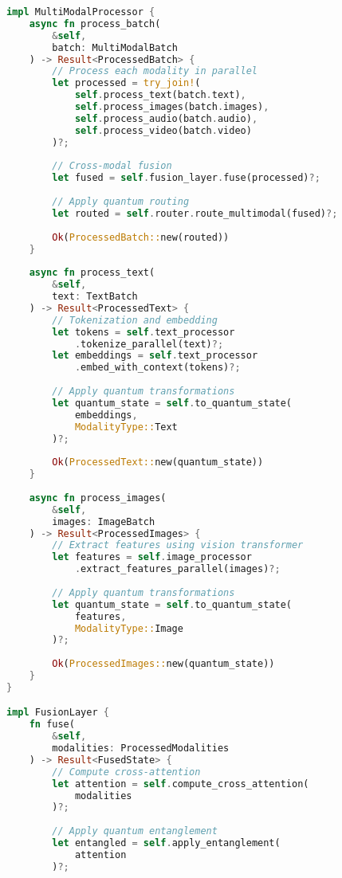 \documentclass[10pt,twocolumn]{article}
\begin{document}
\begin{lstlisting}[language=Rust]
impl MultiModalProcessor {
    async fn process_batch(
        &self,
        batch: MultiModalBatch
    ) -> Result<ProcessedBatch> {
        // Process each modality in parallel
        let processed = try_join!(
            self.process_text(batch.text),
            self.process_images(batch.images),
            self.process_audio(batch.audio),
            self.process_video(batch.video)
        )?;
        
        // Cross-modal fusion
        let fused = self.fusion_layer.fuse(processed)?;
        
        // Apply quantum routing
        let routed = self.router.route_multimodal(fused)?;
        
        Ok(ProcessedBatch::new(routed))
    }
    
    async fn process_text(
        &self,
        text: TextBatch
    ) -> Result<ProcessedText> {
        // Tokenization and embedding
        let tokens = self.text_processor
            .tokenize_parallel(text)?;
        let embeddings = self.text_processor
            .embed_with_context(tokens)?;
            
        // Apply quantum transformations
        let quantum_state = self.to_quantum_state(
            embeddings,
            ModalityType::Text
        )?;
        
        Ok(ProcessedText::new(quantum_state))
    }
    
    async fn process_images(
        &self,
        images: ImageBatch
    ) -> Result<ProcessedImages> {
        // Extract features using vision transformer
        let features = self.image_processor
            .extract_features_parallel(images)?;
            
        // Apply quantum transformations
        let quantum_state = self.to_quantum_state(
            features,
            ModalityType::Image
        )?;
        
        Ok(ProcessedImages::new(quantum_state))
    }
}

impl FusionLayer {
    fn fuse(
        &self,
        modalities: ProcessedModalities
    ) -> Result<FusedState> {
        // Compute cross-attention
        let attention = self.compute_cross_attention(
            modalities
        )?;
        
        // Apply quantum entanglement
        let entangled = self.apply_entanglement(
            attention
        )?;
        

\end{lstlisting}
\end{document}

